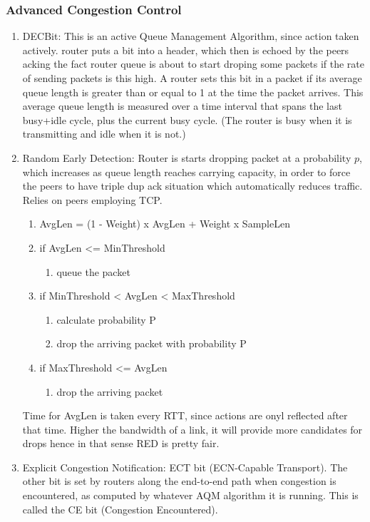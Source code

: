 \documentclass[11pt, a4paper]{article}
\begin{document}
\subsubsection{Advanced Congestion Control}
\begin{enumerate}
    \item DECBit: This is an active Queue Management Algorithm, since action taken actively. router puts a bit into a header, which then is echoed by the peers acking the fact router queue is about to start droping some packets if the rate of sending packets is this high. A router sets this bit in a packet if its average queue length is greater than or equal to 1 at the time the packet arrives. This average queue length is measured over a time interval that spans the last busy+idle cycle, plus the current busy cycle. (The router is busy when it is transmitting and idle when it is not.)
    \item Random Early Detection: Router is starts dropping packet at a probability $p$, which increases as queue length reaches carrying capacity, in order to force the peers to have triple dup ack situation which automatically reduces traffic. Relies on peers employing TCP.
    \begin{enumerate}
    \item AvgLen = (1 - Weight) x AvgLen + Weight x SampleLen
        \item if AvgLen <= MinThreshold
        \begin{enumerate}
            \item queue the packet
        \end{enumerate}
    \item if MinThreshold < AvgLen < MaxThreshold
    \begin{enumerate}
        \item calculate probability P
        \item drop the arriving packet with probability P
    \end{enumerate}
    \item if MaxThreshold <= AvgLen
    \begin{enumerate}
        \item drop the arriving packet
    \end{enumerate}
    \end{enumerate}
    Time for AvgLen is taken every RTT, since actions are onyl reflected after that time.
    Higher the bandwidth of a link, it will provide more candidates for drops hence in that sense RED is pretty fair.
    \item Explicit Congestion Notification: ECT bit (ECN-Capable Transport). The other bit is set by routers along the end-to-end path when congestion is encountered, as computed by whatever AQM algorithm it is running. This is called the CE bit (Congestion Encountered).
    

\end{enumerate}
\end{document}
